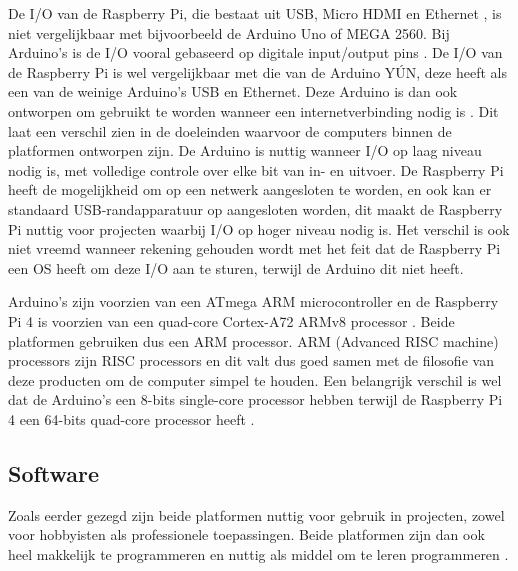 \documentclass[a4paper, dutch, abstract=true]{scrartcl}
\begin{document}
De I/O van de Raspberry Pi, die bestaat uit USB, Micro HDMI en Ethernet \cite{raspberry20194bspecs},
is niet vergelijkbaar met bijvoorbeeld de Arduino Uno of MEGA 2560.
Bij Arduino's is de I/O vooral gebaseerd op digitale input/output pins
\cite{arduino2019mega,arduino2019uno}.
De I/O van de Raspberry Pi is wel vergelijkbaar met die van de Arduino Y{\'U}N, deze heeft als een
van de weinige Arduino's USB en Ethernet.
Deze Arduino is dan ook ontworpen om gebruikt te worden wanneer een internetverbinding nodig is
\cite{arduino2019yun}.
Dit laat een verschil zien in de doeleinden waarvoor de computers binnen de platformen ontworpen
zijn.
De Arduino is nuttig wanneer I/O op laag niveau nodig is, met volledige controle over elke bit van
in- en uitvoer.
De Raspberry Pi heeft de mogelijkheid om op een netwerk aangesloten te worden, en ook kan er
standaard USB-randapparatuur op aangesloten worden, dit maakt de Raspberry Pi nuttig voor projecten
waarbij I/O op hoger niveau nodig is.
Het verschil is ook niet vreemd wanneer rekening gehouden wordt met het feit dat de Raspberry Pi een
OS heeft om deze I/O aan te sturen, terwijl de Arduino dit niet heeft.

Arduino's zijn voorzien van een ATmega ARM microcontroller
\cite{arduino2019mega,arduino2019uno,arduino2019yun,arduino2019leonardo,kumar2015arduino} en de
Raspberry Pi 4 is voorzien van een quad-core Cortex-A72 ARMv8 processor \cite{raspberry2019brief}.
Beide platformen gebruiken dus een ARM processor.
ARM (Advanced RISC machine) processors zijn RISC processors en dit valt dus goed samen met de
filosofie van deze producten om de computer simpel te houden.
Een belangrijk verschil is wel dat de Arduino's een 8-bits single-core processor hebben terwijl de
Raspberry Pi 4 een 64-bits quad-core processor heeft \cite{raspberry2019brief}.
\\

\subsection{Software}
Zoals eerder gezegd zijn beide platformen nuttig voor gebruik in projecten, zowel voor hobbyisten
als professionele toepassingen.
Beide platformen zijn dan ook heel makkelijk te programmeren en nuttig als middel om te leren
programmeren \cite{raspberry2015what,jamieson2011arduino,rubio2013using}.
\end{document}
